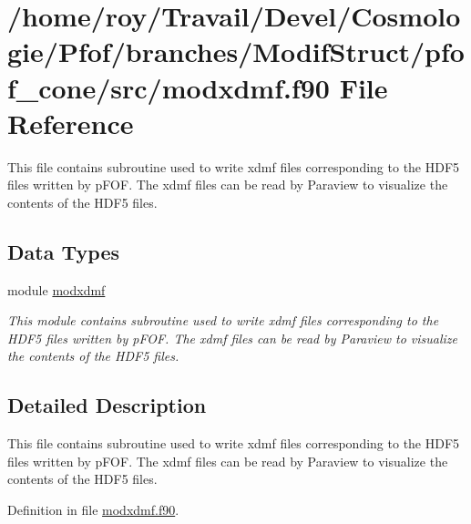 \hypertarget{pfof__cone_2src_2modxdmf_8f90}{\section{/home/roy/\-Travail/\-Devel/\-Cosmologie/\-Pfof/branches/\-Modif\-Struct/pfof\-\_\-cone/src/modxdmf.f90 File Reference}
\label{pfof__cone_2src_2modxdmf_8f90}
}


This file contains subroutine used to write xdmf files corresponding to the H\-D\-F5 files written by p\-F\-O\-F. The xdmf files can be read by Paraview to visualize the contents of the H\-D\-F5 files.  


\subsection*{Data Types}
\begin{DoxyCompactItemize}
\item 
module \hyperlink{classmodxdmf}{modxdmf}
\begin{DoxyCompactList}\small\item\em This module contains subroutine used to write xdmf files corresponding to the H\-D\-F5 files written by p\-F\-O\-F. The xdmf files can be read by Paraview to visualize the contents of the H\-D\-F5 files. \end{DoxyCompactList}\end{DoxyCompactItemize}


\subsection{Detailed Description}
This file contains subroutine used to write xdmf files corresponding to the H\-D\-F5 files written by p\-F\-O\-F. The xdmf files can be read by Paraview to visualize the contents of the H\-D\-F5 files. 

Definition in file \hyperlink{pfof__cone_2src_2modxdmf_8f90_source}{modxdmf.\-f90}.

